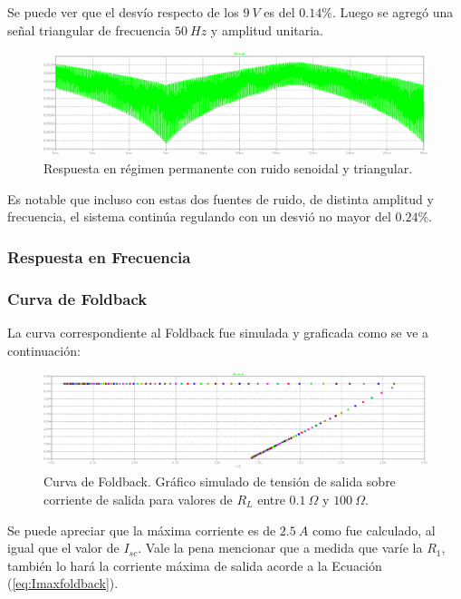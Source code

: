 Se puede ver que el desvío respecto de los $9 \ V$ es del $0.14\%$. Luego se agregó una señal triangular de frecuencia $50 \ Hz$ y amplitud unitaria.
\begin{figure}[H]
\centering
	\includegraphics[width=1\textwidth]{ImagenesEjercicio2/permrespsinetri.png}
	\caption{Respuesta en régimen permanente con ruido senoidal y triangular.}
	\label{fig:permanenteFuentesinetri}
\end{figure}

Es notable que incluso con estas dos fuentes de ruido, de distinta amplitud y frecuencia, el sistema continúa regulando con un desvió no mayor del $0.24\%$.

\subsubsection{Respuesta en Frecuencia}

\subsubsection{Curva de Foldback}
La curva correspondiente al Foldback fue simulada y graficada como se ve a continuación:
\begin{figure}[H]
\centering
	\includegraphics[width=1\textwidth]{ImagenesEjercicio2/curvefoldback.png}
	\caption{Curva de Foldback. Gráfico simulado de tensión de salida sobre corriente de salida para valores de $R_L$ entre $0.1 \ \Omega$ y $100 \ \Omega$.}
	\label{fig:GraficoFOldbacki}
\end{figure}

Se puede apreciar que la máxima corriente es de $2.5 \ A$ como fue calculado, al igual que el valor de $I_{sc}$. Vale la pena mencionar que a medida que varíe la $R_1$, también lo hará la corriente máxima de salida acorde a la Ecuación (\ref{eq:Imaxfoldback}).

